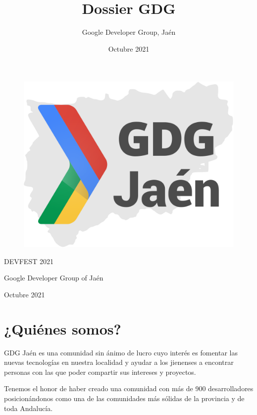 \documentclass[12pt]{article}
\title{Dossier GDG}
\author{Google Developer Group, Jaén }
\date{Octubre 2021}
\begin{document}
\begin{titlepage}
\centering
\begin{figure}[h]
\vspace{3.5cm}
\centering
\includegraphics[scale=0.5]{LogoGDGJaenProvinciaFondoBlanco.png}
\end{figure}
\vspace{3cm}
{\scshape\Huge DEVFEST 2021\par}
\vspace{3cm}
{\itshape\Large \par}
\vfill
{\Large Google Developer Group of Jaén \par}
\vfill
{\Large Octubre 2021 \par}
\end{titlepage}


\newpage

\tableofcontents

\newpage
\section{¿Quiénes somos?}


GDG Jaén es una comunidad sin ánimo de lucro cuyo interés es fomentar las nuevas tecnologías en nuestra localidad y ayudar a los jienenses a encontrar personas con las que poder compartir sus intereses y proyectos.


Tenemos el honor de haber creado una comunidad con más de 900 desarrolladores posicionándonos como una de las comunidades más sólidas de la provincia y de toda Andalucía.
\end{document}
